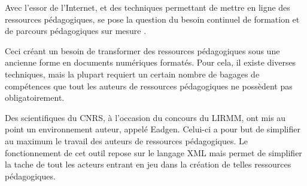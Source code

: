 Avec l'essor de l'Internet, et des techniques permettant de mettre
en ligne des ressources pédagogiques, se pose la question du besoin
continuel de formation et de parcours pédagogiques \og sur mesure \fg.

Ceci créant un besoin de transformer des ressources pédagogiques sous
une ancienne forme en documents numériques formatés. Pour cela, il
existe diverses techniques, mais la plupart requiert un certain
nombre de bagages de compétences que tout les auteurs de ressources
pédagogiques ne possèdent pas obligatoirement. 

Des scientifiques du CNRS, à l'occasion du concours du LIRMM, ont mis
au point un environnement auteur, appelé Eadgen. Celui-ci a pour but
de simplifier au maximum le travail des auteurs de ressources pédagogiques.
Le fonctionnement de cet outil repose sur le langage XML mais permet
de simplifier la tache de tout les acteurs entrant en jeu dans la 
création de telles ressources pédagogiques.